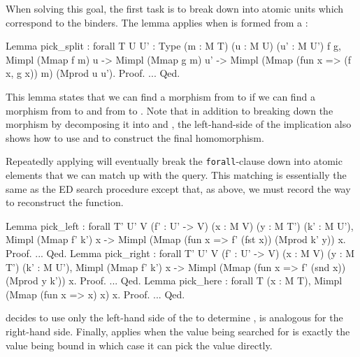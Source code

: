 \documentclass[preprint]{sigplanconf}
\begin{document}
When solving this goal, the first task is to break  down into atomic units which correspond to the binders.
The  lemma applies when  is formed from a :
\begin{coq}
Lemma pick_split
: forall {T U U' : Type} (m : M T) (u : M U) (u' : M U') f g,
  Mimpl (Mmap f m) u ->
  Mimpl (Mmap g m) u' ->
  Mimpl (Mmap (fun x => (f x, g x)) m) (Mprod u u').
Proof. ... Qed.
\end{coq}
This lemma states that we can find a morphism from  to  if we can find a morphism from  to  and from  to .
Note that in addition to breaking down the morphism by decomposing it into  and , the left-hand-side of the implication also shows how to use  and  to construct the final homomorphism.

Repeatedly applying  will eventually break the {\tt forall}-clause down into atomic elements that we can match up with the query.
This matching is essentially the same as the ED search procedure except that, as above, we must record the way to reconstruct the  function.
\begin{coq}
Lemma pick_left
: forall {T' U' V} (f' : U' -> V) (x : M V) (y : M T') (k' : M U'),
  Mimpl (Mmap f' k') x ->
  Mimpl (Mmap (fun x => f' (fst x)) (Mprod k' y)) x.
Proof. ... Qed.
Lemma pick_right
: forall {T' U' V} (f' : U' -> V) (x : M V) (y : M T') (k' : M U'),
  Mimpl (Mmap f' k') x ->
  Mimpl (Mmap (fun x => f' (snd x)) (Mprod y k')) x.
Proof. ... Qed.
Lemma pick_here
: forall {T} (x : M T), Mimpl (Mmap (fun x => x) x) x.
Proof. ... Qed.
\end{coq}
 decides to use only the left-hand side of the  to determine ,  is analogous for the right-hand side.
Finally,  applies when the value being searched for is exactly the value being bound in which case it can pick the value directly.
\end{document}
